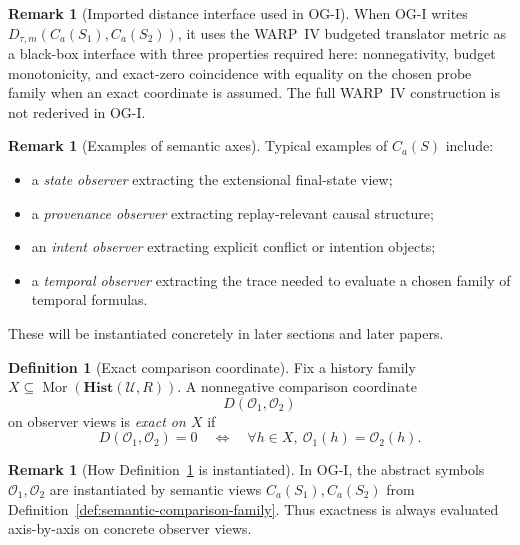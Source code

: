\documentclass[11pt,twoside]{article}
\theoremstyle{definition}
\newtheorem{definition}[theorem]{Definition}
\newtheorem{remark}[theorem]{Remark}
\newcommand{\Hist}{\mathbf{Hist}}
\DeclareMathOperator{\Mor}{Mor}
\begin{document}
\begin{remark}[Imported distance interface used in OG-I]
\label{rem:imported-distance-interface}
When OG-I writes \(D_{\tau,m}(C_a(S_1),C_a(S_2))\), it uses the WARP~IV budgeted translator metric as a black-box interface with three properties required here: nonnegativity, budget monotonicity, and exact-zero coincidence with equality on the chosen probe family when an exact coordinate is assumed. The full WARP~IV construction is not rederived in OG-I.
\end{remark}

\begin{remark}[Examples of semantic axes]
\label{rem:semantic-axis-examples}
Typical examples of \(C_a(S)\) include:
\begin{itemize}[leftmargin=*]
  \item a \emph{state observer} extracting the extensional final-state view;
  \item a \emph{provenance observer} extracting replay-relevant causal structure;
  \item an \emph{intent observer} extracting explicit conflict or intention objects;
  \item a \emph{temporal observer} extracting the trace needed to evaluate a chosen family of temporal formulas.
\end{itemize}
These will be instantiated concretely in later sections and later papers.
\end{remark}

\begin{definition}[Exact comparison coordinate]
\label{def:exact-comparison-coordinate}
Fix a history family \(X\subseteq \Mor(\Hist(\mathcal{U},R))\). A nonnegative comparison coordinate
\[
  D(\mathcal{O}_1,\mathcal{O}_2)
\]
on observer views is \emph{exact on \(X\)} if
\[
  D(\mathcal{O}_1,\mathcal{O}_2)=0
  \quad\Longleftrightarrow\quad
  \forall h\in X,\ \mathcal{O}_1(h)=\mathcal{O}_2(h).
\]
\end{definition}

\begin{remark}[How Definition~\ref{def:exact-comparison-coordinate} is instantiated]
\label{rem:exact-coordinate-instantiation}
In OG-I, the abstract symbols \(\mathcal{O}_1,\mathcal{O}_2\) are instantiated by semantic views \(C_a(S_1),C_a(S_2)\) from Definition~\ref{def:semantic-comparison-family}. Thus exactness is always evaluated axis-by-axis on concrete observer views.
\end{remark}
\end{document}
